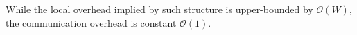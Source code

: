 While the local overhead implied by such structure is upper-bounded by
$\mathcal{O}(W)$, the communication overhead is constant $\mathcal{O}(1)$.












